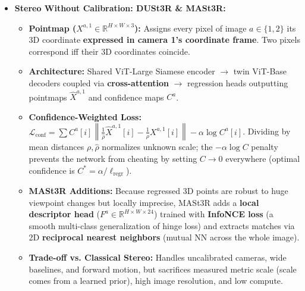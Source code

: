 \documentclass[10pt, a4paper]{article}
\begin{document}
\begin{itemize}
\begin{itemize}
        \item \textbf{DispNet:} End-to-end 2D encoder-decoder with a 1D correlation layer; pretrained on synthetic data (FlyingThings3D).
        \item \textbf{GC-Net:} Builds a 4D cost volume ($H \times W \times D \times F$), regularizes with 3D convolutions, and extracts sub-pixel disparity via differentiable \textbf{Soft Argmin}: $\hat{d} = \sum_{d=0}^{d_{\max}} d \cdot \text{softmax}(-c_\theta(d))$. \textbf{Flaw:} High 3D memory cost, and bimodal cost curves at occlusion edges average out to flying pixels between modes.
    \end{itemize}
    \item \textbf{Stereo Without Calibration: DUSt3R \& MASt3R:}
    \begin{itemize}
        \item \textbf{Pointmap ($X^{a,1} \in \mathbb{R}^{H \times W \times 3}$):} Assigns every pixel of image $a \in \{1,2\}$ its 3D coordinate \textbf{expressed in camera 1's coordinate frame}. Two pixels correspond iff their 3D coordinates coincide.
        \item \textbf{Architecture:} Shared ViT-Large Siamese encoder $\rightarrow$ twin ViT-Base decoders coupled via \textbf{cross-attention} $\rightarrow$ regression heads outputting pointmaps $\hat{X}^{a,1}$ and confidence maps $C^a$.
        \item \textbf{Confidence-Weighted Loss:} $\mathcal{L}_{\text{conf}} = \sum C^a[i] \left\|\frac{1}{\hat{\rho}}\hat{X}^{a,1}[i] - \frac{1}{\rho}X^{a,1}[i]\right\| - \alpha \log C^a[i]$. Dividing by mean distances $\rho, \hat{\rho}$ normalizes unknown scale; the $-\alpha\log C$ penalty prevents the network from cheating by setting $C \to 0$ everywhere (optimal confidence is $C^* = \alpha / \ell_{\text{regr}}$).
        \item \textbf{MASt3R Additions:} Because regressed 3D points are robust to huge viewpoint changes but locally imprecise, MASt3R adds a \textbf{local descriptor head} ($F^a \in \mathbb{R}^{H \times W \times 24}$) trained with \textbf{InfoNCE loss} (a smooth multi-class generalization of hinge loss) and extracts matches via 2D \textbf{reciprocal nearest neighbors} (mutual NN across the whole image).
        \item \textbf{Trade-off vs. Classical Stereo:} Handles uncalibrated cameras, wide baselines, and forward motion, but sacrifices measured metric scale (scale comes from a learned prior), high image resolution, and low compute.
    \end{itemize}
\end{itemize}
\end{document}
